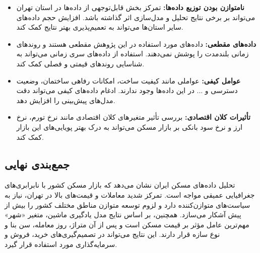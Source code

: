 \documentclass[twoside,reqno]{amsart}
\begin{document}
\begin{itemize}
        \item \textbf{نامتوازن بودن توزیع داده‌ها:} تمرکز بخش قابل‌توجهی از داده‌ها در استان تهران می‌تواند بر برخی نتایج تحلیل و مدل‌سازی اثر گذاشته باشد. افزایش حجم داده‌های سایر استان‌ها می‌تواند به تعمیم‌پذیری بهتر نتایج کمک کند.

\item \textbf{داده‌های مقطعی:} داده‌های مورد استفاده در این پژوهش مقطعی هستند و روندهای زمانی بلندمدت را پوشش نمی‌دهند. استفاده از داده‌های سری زمانی می‌تواند به شناسایی روندهای قیمتی و فصلی کمک کند.
        
    \item \textbf{عوامل کیفی:} عواملی مانند کیفیت ساخت، امکانات رفاهی ساختمان، وضعیت دسترسی و ... در این داده‌ها وجود ندارند. ادغام داده‌های کیفی می‌تواند دقت مدل‌های پیش‌بینی را افزایش دهد.
        
    \item \textbf{تأثیرات کلان اقتصادی:} بررسی تأثیر متغیرهای کلان اقتصادی مانند نرخ تورم، نرخ ارز و نرخ سود بانکی بر بازار مسکن می‌تواند به درک بهتر پویایی‌های این بازار کمک 
        کند.
\end{itemize}

\subsection{جمع‌بندی نهایی}

تحلیل داده‌های مسکن ایران نشان می‌دهد که بازار مسکن کشور با نابرابری‌های جغرافیایی عمیقی مواجه است. تمرکز شدید معاملات و قیمت‌های بالا در تهران، نیاز به سیاست‌های متوازن‌کننده دارد و لزوم توسعه متوازن مناطق مختلف کشور را بیش از پیش آشکار می‌سازد. همچنین، بر اساس نتایج مدل یادگیری ماشین، متغیر «شهر» مهم‌ترین عامل مؤثر بر قیمت مسکن است و پس از آن متراژ، روز معامله، سن بنا و نوع سازه قرار دارند. این نتایج می‌تواند در تصمیم‌گیری‌های خرید، فروش و سرمایه‌گذاری مورد استفاده قرار گیرد.

   
\end{document}
